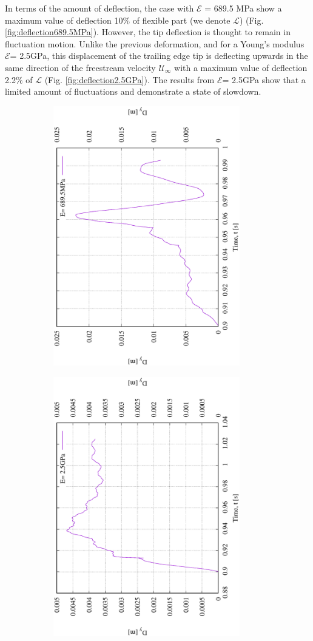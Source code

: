 In terms of the amount of deflection, the case with $\mathcal{E}$ = 689.5 MPa show a maximum value of deflection 10$\%$ of flexible part (we denote $\mathcal{L}$) (Fig. \ref{fig:deflection689.5MPa}). However, the tip deﬂection is thought to remain in fluctuation motion. Unlike the previous deformation, and for a Young's modulus $\mathcal{E}$= 2.5GPa, this displacement of the trailing edge tip is deflecting upwards in the same direction of the freestream velocity $\mathcal{U}_\infty$ with a maximum value of deflection 2.2$\%$ of $\mathcal{L}$ (Fig. \ref{fig:deflection2.5GPa}). The results from $\mathcal{E}$= 2.5GPa show that a limited amount of fluctuations and demonstrate a state of slowdown. 

\begin{figure}[hbt!]
\centering
\begin{subfigure}{.4\textwidth}
   \includegraphics[width=3.2in]{Figures/deflection689MPa090.ps}
  \caption{\label{fig:deflection689.5MPa}}
\label{fig:airfoildesigna}
\end{subfigure}
\begin{subfigure}{.4\textwidth}
   \includegraphics[width=3.2in]{Figures/deflection25GPa10.ps}

\end{subfigure}
\end{figure}
